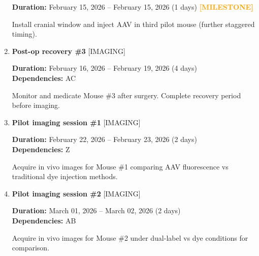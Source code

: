 \documentclass[landscape,a4paper]{article}
\begin{document}
\begin{enumerate}[leftmargin=1.5cm, itemsep=1em, parsep=0.5em]
          \vspace{0.2em}
          \textcolor{black!70}{\textbf{Duration:} February 15, 2026 -- February 15, 2026 (1 days)}
          \textcolor{orange}{\textbf{ [MILESTONE]}}\n
          \vspace{0.4em}
          \begin{minipage}[t]{0.9\textwidth}
          \textcolor{black!85}{Install cranial window and inject AAV in third pilot mouse (further staggered timing).}
          \end{minipage}

    \item \textcolor{other}{\textbf{\large Post-op recovery \#3}}
          \hfill \textcolor{black!60}{\small [IMAGING]}
          
          \vspace{0.2em}
          \textcolor{black!70}{\textbf{Duration:} February 16, 2026 -- February 19, 2026 (4 days)}
          \\[0.2em]\textcolor{black!70}{\textbf{Dependencies:} AC}\n
          \vspace{0.4em}
          \begin{minipage}[t]{0.9\textwidth}
          \textcolor{black!85}{Monitor and medicate Mouse \#3 after surgery. Complete recovery period before imaging.}
          \end{minipage}

    \item \textcolor{other}{\textbf{\large Pilot imaging session \#1}}
          \hfill \textcolor{black!60}{\small [IMAGING]}
          
          \vspace{0.2em}
          \textcolor{black!70}{\textbf{Duration:} February 22, 2026 -- February 23, 2026 (2 days)}
          \\[0.2em]\textcolor{black!70}{\textbf{Dependencies:} Z}\n
          \vspace{0.4em}
          \begin{minipage}[t]{0.9\textwidth}
          \textcolor{black!85}{Acquire in vivo images for Mouse \#1 comparing AAV fluorescence vs traditional dye injection methods.}
          \end{minipage}

    \item \textcolor{other}{\textbf{\large Pilot imaging session \#2}}
          \hfill \textcolor{black!60}{\small [IMAGING]}
          
          \vspace{0.2em}
          \textcolor{black!70}{\textbf{Duration:} March 01, 2026 -- March 02, 2026 (2 days)}
          \\[0.2em]\textcolor{black!70}{\textbf{Dependencies:} AB}\n
          \vspace{0.4em}
          \begin{minipage}[t]{0.9\textwidth}
          \textcolor{black!85}{Acquire in vivo images for Mouse \#2 under dual-label vs dye conditions for comparison.}
          \end{minipage}


\end{enumerate}
\end{document}
